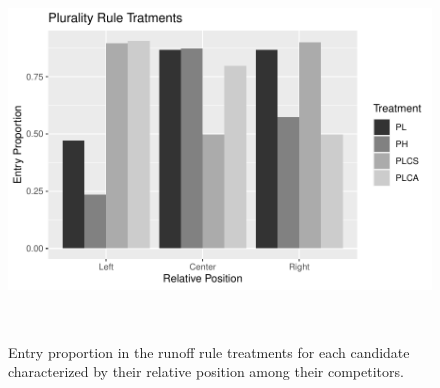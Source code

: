 \begin{figure}
	\includegraphics[width=1\linewidth, height=10cm]{barplot_prop_pluralities.pdf} 
	\caption{Entry proportion in the runoff rule treatments for each candidate characterized by their relative position among their competitors.}
	\label{fig:barplot_PRs}
\end{figure}